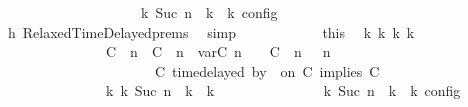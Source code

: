 \begin{isabellebody}
\ \ \ \ \ \ \ \ \ \ \ \ \ \ \ \ {\isasymand}\ {\isasymrho}\ {\isasymin}\ {\isasymlbrakk}\ {\isasymGamma}\isactrlsub k{\isacharcomma}\ Suc\ n\ {\isasymturnstile}\ {\isasymPsi}\isactrlsub k\ {\isasymtriangleright}\ {\isasymPhi}\isactrlsub k\ {\isasymrbrakk}\isactrlsub c\isactrlsub o\isactrlsub n\isactrlsub f\isactrlsub i\isactrlsub g{\isacartoucheclose}\isanewline
\ \ \ \ \ \ \ \ \ \ \ \ \isamarkupfalse%
\ h{}\ RelaxedTimeDelayed{\isachardot}prems\ \isamarkupfalse%
\ simp\isanewline
\ \ \ \ \ \ \ \ \ \ \isamarkupfalse%
\ this\ \isamarkupfalse%
\ {\isasymGamma}\isactrlsub k\ {\isasymPsi}\isactrlsub k\ {\isasymPhi}\isactrlsub k\ k\ \ {\isacartoucheopen}\isanewline
\ \ \ \ \ \ \ \ \ \ \ \ \ \ {\isacharparenleft}\ {\isacharparenleft}{\isacharparenleft}{\isacharparenleft}C\ {\isasymUp}\ n{\isacharparenright}\ {\isacharhash}\ {\isacharparenleft}C\ {\isasymDown}\ n\ {\isacharat}{\isasymsharp}\ {\isasymlparr}{\isasymtau}\isactrlsub v\isactrlsub a\isactrlsub r{\isacharparenleft}C\ n{\isacharparenright}\ {\isasymoplus}\ {\isasymdelta}{\isasymtau}{\isasymrparr}{\isacharparenright}\ {\isacharhash}\ {\isacharparenleft}C\ {\isasymUp}\ n{\isacharparenright}\ {\isacharhash}\ {\isasymGamma}{\isacharparenright}{\isacharcomma}\ n\isanewline
\ \ \ \ \ \ \ \ \ \ \ \ \ \ \ \ \ \ \ {\isasymturnstile}\ {\isasymPsi}\ {\isasymtriangleright}\ {\isacharparenleft}{\isacharparenleft}C\ time{\isacharminus}delayed{\isasymbowtie}\ by\ {\isasymdelta}{\isasymtau}\ on\ C\ implies\ C\ {\isacharhash}\ {\isasymPhi}{\isacharparenright}{\isacharparenright}\isanewline
\ \ \ \ \ \ \ \ \ \ \ \ \ \ \ {\isasymhookrightarrow}\isactrlbsup k\isactrlesup \ {\isacharparenleft}{\isasymGamma}\isactrlsub k{\isacharcomma}\ Suc\ n\ {\isasymturnstile}\ {\isasymPsi}\isactrlsub k\ {\isasymtriangleright}\ {\isasymPhi}\isactrlsub k{\isacharparenright}{\isacharparenright}{\isacartoucheclose}\isanewline
\ \ \ \ \ \ \ \ \ \ \ \ {\isacharasterisk}{\isacharcolon}{\isacartoucheopen}{\isasymrho}\ {\isasymin}\ {\isasymlbrakk}\ {\isasymGamma}\isactrlsub k{\isacharcomma}\ Suc\ n\ {\isasymturnstile}\ {\isasymPsi}\isactrlsub k\ {\isasymtriangleright}\ {\isasymPhi}\isactrlsub k\ {\isasymrbrakk}\isactrlsub c\isactrlsub o\isactrlsub n\isactrlsub f\isactrlsub i\isactrlsub g{\isacartoucheclose}\ \isamarkupfalse%

\end{isabellebody}
